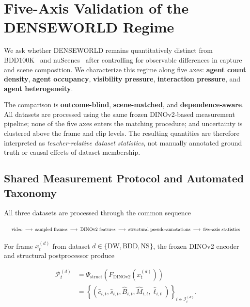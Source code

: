 \section{Five-Axis Validation of the DENSEWORLD Regime}
\label{app:benchmark_validation}

We ask whether DENSEWORLD remains quantitatively distinct from
BDD100K~\cite{yu2020bdd100k} and
nuScenes~\cite{caesar2020nuscenes} after controlling for observable
differences in capture and scene composition. We characterize this
regime along five axes: \textbf{agent count density},
\textbf{agent occupancy}, \textbf{visibility pressure},
\textbf{interaction pressure}, and \textbf{agent heterogeneity}.

The comparison is \textbf{outcome-blind}, \textbf{scene-matched}, and
\textbf{dependence-aware}. All datasets are processed using the same
frozen DINOv2-based measurement pipeline; none of the five axes enters
the matching procedure; and uncertainty is clustered above the frame
and clip levels. The resulting quantities are therefore interpreted as
\emph{teacher-relative dataset statistics}, not manually annotated
ground truth or causal effects of dataset membership.


\subsection{Shared Measurement Protocol and Automated Taxonomy}
\label{app:shared_taxonomy}

All three datasets are processed through the common sequence

\begin{equation*}
\resizebox{0.98\columnwidth}{!}{$\displaystyle
\text{video}
\;\longrightarrow\;
\text{sampled frames}
\;\longrightarrow\;
\text{DINOv2 features}
\;\longrightarrow\;
\text{structural pseudo-annotations}
\;\longrightarrow\;
\text{five-axis statistics}
$}
\end{equation*}

For frame \(x_t^{(d)}\) from dataset
\(d\in\{\mathrm{DW},\mathrm{BDD},\mathrm{NS}\}\), the frozen DINOv2
encoder~\cite{oquab2024dinov2} and structural postprocessor produce

\begin{equation*}
\begin{aligned}
\mathcal P_t^{(d)}
&=
\Psi_{\mathrm{struct}}
\left(
F_{\mathrm{DINOv2}}(x_t^{(d)})
\right)
\\
&=
\left\{
\left(
\hat c_{i,t},
\hat s_{i,t},
\hat B_{i,t},
\hat M_{i,t},
\hat\ell_{i,t}
\right)
\right\}_{i\in\mathcal I_t^{(d)}} .
\end{aligned}
\end{equation*}

